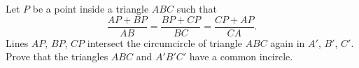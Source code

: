 Let $P$ be a point inside a triangle $ABC$ such that$$ \frac{AP + BP}{AB} = \frac{BP + CP}{BC} = \frac{CP + AP}{CA} .$$Lines $AP$,  $BP$,  $CP$ intersect the circumcircle of triangle $ABC$ again in $A'$,  $B'$,  $C'$. Prove that the triangles $ABC$ and $A'B'C'$ have a common incircle.